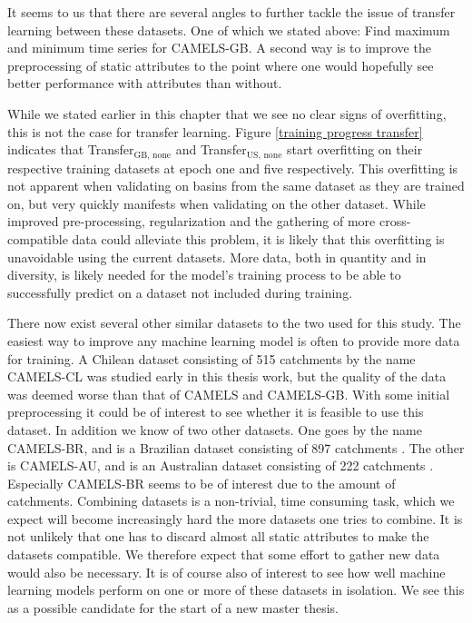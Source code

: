 It seems to us that there are several angles to further tackle the issue of transfer 
learning between these datasets. One of which we stated above: Find maximum and minimum time series for 
CAMELS-GB. A second way is to improve the preprocessing of static attributes to 
the point where one would hopefully see better performance with attributes than 
without.  

While we stated earlier in this chapter that we see no clear signs of overfitting, this is not 
the case for transfer learning. Figure 
\ref{training progress transfer} indicates that Transfer$_\text{GB, none}$ 
and Transfer$_\text{US, none}$ start overfitting on their respective training 
datasets at epoch one and five respectively. This overfitting is not apparent when
validating on basins from the 
same dataset as they are trained on, but very quickly manifests when validating 
on the other dataset. While improved pre-processing, regularization and the gathering 
of more  cross-compatible data could alleviate this problem, it is likely that this 
overfitting is 
unavoidable using the current datasets. More data, both in quantity and in 
diversity, is likely needed for the model's training process to be able to 
successfully predict on a dataset not included during training.

There now exist several other similar datasets to the two used for this study. 
The easiest way to improve 
any machine learning model is often to provide more data for training. A Chilean 
dataset consisting of 515 catchments by the name CAMELS-CL \citep{CAMELS_CL} 
was studied early in this thesis work, but the quality 
of the data was deemed worse than that of CAMELS and CAMELS-GB. With some initial 
preprocessing it could be of interest to see whether it is feasible to use this 
dataset.
In addition we know of two other datasets. One goes by the name CAMELS-BR, and is 
a Brazilian dataset consisting of 897 catchments \citep{CAMELS_BR}.
The other is CAMELS-AU, and is an Australian dataset consisting of 222 catchments
 \citep{CAMELS_AU}. Especially CAMELS-BR seems to be of interest due to the 
amount of catchments. Combining datasets is a non-trivial, time consuming task, which 
we expect will become increasingly hard the more datasets one tries to combine. 
It is not unlikely that one has to discard almost all static attributes to make 
the datasets compatible. We therefore expect that some effort to gather new data 
would also be necessary. It is of course also of interest to see how well machine 
learning models perform on one or more of these datasets in isolation. 
We see this as a possible candidate for the start of a new master thesis.
